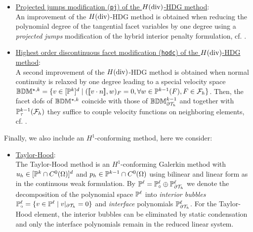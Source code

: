 \documentclass[pdflatex,sn-mathphys,Numbered]{sn-jnl}%
\theoremstyle{remark}%
\theoremstyle{definition}%
\begin{document}
\begin{itemize}
  Let $\BDM^\ell = \BDM_{\circ}^\ell \oplus \BDM_{\partial \Th}^\ell$ be the decomposition of the $\BDM^\ell$ space into \emph{interior normal-bubbles} $\BDM_{\circ}^\ell = \{v \in \BDM^\ell \mid v \cdot n|_{\partial \Th} = 0\}$ and \emph{interface} functions $\BDM_{\partial \Th}^\ell$ with $\Div \BDM_{\partial \Th}^\ell = \PP^0$, cf. \cite{zaglmayr2006high}.
  Then, the interior normal-bubbles (which determine the higher-order divergence of the velocity) can be statically condensed alongside the higher-order pressures. Only the facet variables (normal \texttt{dof} of the $\BDM_{\partial \Th}^k$ space and the tangential vector functions in $\PP_\tau^k(\Fh)$) and the piecewise constant pressure functions in $\PP^0(\Th)$ remain in the global linear system.
  \item \underline{Projected jumps modification (\texttt{pj}) of the $H(\operatorname{\mathrm{div}})$-HDG method}: \\[0.4ex] An improvement of the $H(\operatorname{\mathrm{div}})$-HDG method is obtained when reducing the polynomial degree of the tangential facet variables by one degree using a \emph{projected jumps} modification of the hybrid interior penalty formulation, cf. \cite{LS_CMAME_2016}.
  \item \underline{Highest order discontinuous facet modification (\texttt{hodc}) of the $H(\operatorname{\mathrm{div}})$-HDG method}: \\[0.4ex] A second improvement of the $H(\operatorname{\mathrm{div}})$-HDG method is obtained when normal continuity is relaxed by one degree leading to a special velocity space $\mathbb{B}\mathbb{D}\mathbb{M}^{\star,k} = \{ v \in [\mathbb{P}^k]^d \mid ([\![v \cdot n]\!],w)_F = 0, \forall w \in \mathbb{P}^{k-1}(F), F \in {\mathcal{F}_h}\}$. Then, the facet dofs of $\mathbb{B}\mathbb{D}\mathbb{M}^{\star,k}$ coincide with those of $\mathbb{B}\mathbb{D}\mathbb{M}_{\partial {\mathcal{T}_h}}^{k-1}$ and together with $\mathbb{P}_\tau^{k-1}({\mathcal{F}_h})$ they suffice to couple velocity functions on neighboring elements, cf. \cite{LLS_SIAM_2017,LLS_ESAIM_2019}. 
\end{itemize}    
%
Finally, we also include an $H^1$-conforming method, here we consider:
\begin{itemize}
    \item \underline{Taylor-Hood}: \\[0.4ex] The Taylor-Hood method is an $H^1$-conforming Galerkin method with $u_h \in [\mathbb{P}^k \cap C^0(\Omega)]^d$ and $p_h \in \mathbb{P}^{k-1} \cap C^0(\Omega)$ using bilinear and linear form as in the continuous weak formulation. 
    By $\mathbb{P}^\ell = \mathbb{P}_{\circ}^\ell \oplus \mathbb{P}_{\partial {\mathcal{T}_h}}^\ell$ we denote the decomposition of the polynomial space $\mathbb{P}^\ell$ into \emph{interior bubbles} $\mathbb{P}_{\circ}^\ell = \{v \in \mathbb{P}^\ell \mid v|_{\partial {\mathcal{T}_h}} = 0\}$ and \emph{interface} polynomials $\mathbb{P}_{\partial {\mathcal{T}_h}}^\ell$.
    For the Taylor-Hood element, the interior bubbles can be eliminated by static condensation and only the interface polynomials remain in the reduced linear system. 
\end{itemize}    
\end{document}
